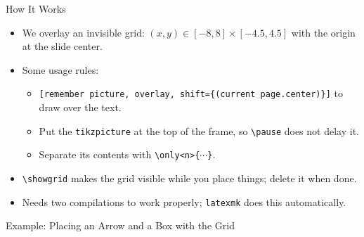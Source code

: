 \begin{frame}[fragile]{How It Works}

\begin{itemize}
\item We overlay an invisible grid: $(x, y) \in [-8, 8] \times [-4.5, 4.5]$ with the origin at the slide center.
\vfill 
\item Some usage rules:
\begin{itemize}
\item \texttt{[remember picture, overlay, shift=\{(current page.center)\}]} to draw over the text.
\item Put the \texttt{tikzpicture} at the top of the frame, so \texttt{\textbackslash pause} does not delay it.
\item Separate its contents with \texttt{\textbackslash only<n>\{$\cdots$\}}.
\end{itemize}

\vfill 
\item \texttt{\textbackslash showgrid} makes the grid visible while you place things; delete it when done.
\vfill 
\item Needs two compilations to work properly; \texttt{latexmk} does this automatically.
\end{itemize}
\vfill
{}
\vfill
\end{frame}


\begin{frame}{Example: Placing an Arrow and a Box with the Grid}
\showgrid
{}
\end{frame}
